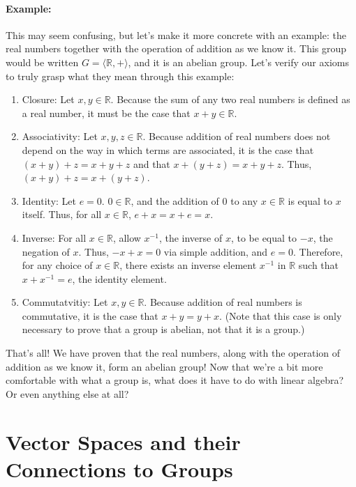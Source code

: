 \documentclass[twoside]{article}
\newcommand{\R}{\mathbb{R}}
\begin{document}
\begin{spacing}{1.25}
\paragraph*{Example:}
This may seem confusing, but let's make it more concrete with an example: 
the real numbers together with the operation of addition as we know it. This 
group would be written $G = \langle \R, +\rangle$, and it is an abelian group. 
Let's verify our axioms 
to truly grasp what they mean through this example:
\begin{enumerate}
    \item Closure: Let $x,y\in\R$. Because the sum of any two real numbers 
    is defined as a real number, it must be the case that $x+y\in\R$. 
    \item Associativity: Let $x,y,z\in\R$. Because addition of real numbers 
    does not depend on the way in which terms are associated, it is the case 
    that $(x+y)+z = x+y+z$ and that $x+(y+z)=x+y+z$. Thus, $(x+y)+z=x+(y+z)$. 
    \item Identity: Let $e = 0$. $0\in\R$, and the addition of 0 to any $x\in\R$
    is equal to $x$ itself. Thus, for all $x\in\R$, $e+x=x+e=x$. 
    \item Inverse: For all $x\in\R$, allow $x^{-1}$, the inverse of $x$, to be equal 
    to $-x$, the negation of $x$. Thus, $-x+x=0$ via simple addition, and $e=0$.
    Therefore, for any choice of $x\in\R$, there exists an inverse element $x^{-1}$ in $\R$
    such that $x+ x^{-1} =e$, the identity element. 
    \item Commutatvitiy: Let $x,y\in\R$. Because addition of real numbers is commutative,
    it is the case that $x+y=y+x$. (Note that this case is only necessary to 
    prove that a group is abelian, not that it is a group.)
\end{enumerate}
That's all! We have proven that the real numbers, along with the operation of 
addition as we know it, form an abelian group! Now that we're a bit more comfortable with 
what a group is, what does it have to do with linear algebra? Or even anything 
else at all?

\section{Vector Spaces and their Connections to Groups}


\end{spacing}
\end{document}
